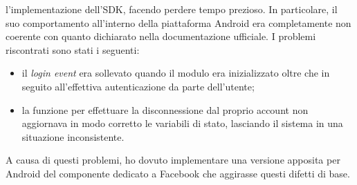 				l'implementazione dell'SDK, facendo perdere tempo prezioso. In particolare, il suo comportamento all'interno della
				piattaforma Android era completamente non coerente con quanto dichiarato nella documentazione ufficiale. I problemi
				riscontrati sono stati i seguenti:
				\begin{itemize}
					\item il \emph{login event} era sollevato quando il modulo era inizializzato oltre che in seguito
					all'effettiva autenticazione da parte dell'utente;
					\item la funzione per effettuare la disconnessione dal proprio account non aggiornava in modo corretto le
					variabili di stato, lasciando il sistema in una situazione inconsistente.
				\end{itemize}
				A causa di questi problemi, ho dovuto implementare una versione apposita per Android del componente dedicato a
				Facebook che aggirasse questi difetti di base.
